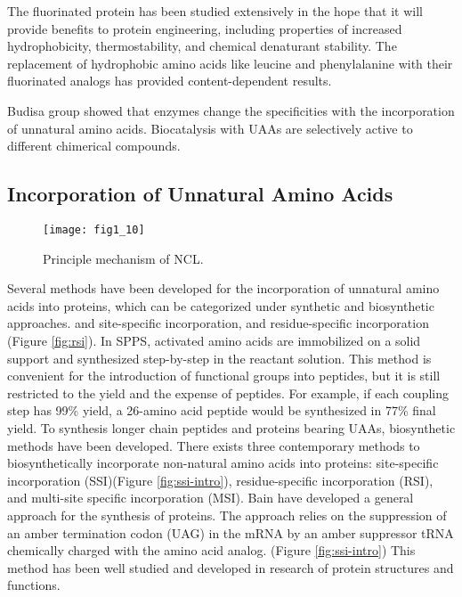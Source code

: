 \begin{refsection}
The fluorinated protein has been studied extensively in the hope that it will
provide benefits to protein engineering, including properties of increased
hydrophobicity, thermostability, and chemical denaturant
stability\cite{Voloshchuk2007b}. The replacement of hydrophobic amino acids
like leucine and phenylalanine with their fluorinated analogs has provided
content-dependent results.

Budisa group showed that enzymes change the specificities with the
incorporation of unnatural amino acids\cite{Budisa2006}. Biocatalysis with UAAs
are selectively active to different chimerical compounds. 

\subsection{Incorporation of Unnatural Amino Acids} 
\label{sec:rsi-intro}

\begin{figure}[h!] \centering \texttt{[image: fig1\_10]}
    \caption[Princilple mechanism of NCL.]{Principle mechanism of NCL.} 
    \label{fig:ncl-intro} 
\end{figure}

Several methods have been developed for the incorporation of unnatural amino
acids into proteins, which can be categorized under synthetic and biosynthetic
approaches.  and  site-specific
incorporation,\cite{Cellitti2008,Hassan2008} and residue-specific incorporation
(Figure \ref{fig:rsi})\cite{Johnson2010}.  In SPPS, activated amino acids are
immobilized on a solid support and synthesized step-by-step in the reactant
solution. This method is convenient for the introduction of functional groups
into peptides, but it is still restricted to the yield and the expense of
peptides. For example, if each coupling step has 99\% yield, a 26-amino acid
peptide would be synthesized in 77\% final yield.  To synthesis longer chain
peptides and proteins bearing UAAs, biosynthetic methods have been developed.
There exists three contemporary methods to biosynthetically incorporate
non-natural amino acids into proteins: site-specific incorporation (SSI)(Figure
\ref{fig:ssi-intro}), residue-specific incorporation (RSI), and multi-site
specific incorporation (MSI). Bain  have developed a general
approach for the  synthesis of proteins\cite{Bain1991}.  The
approach relies on the suppression of an amber termination codon (UAG) in the
mRNA by an amber suppressor tRNA chemically charged with the amino acid analog.
(Figure \ref{fig:ssi-intro}) This method has been well studied and developed in
research of protein structures and functions\cite{Martoglio1995,Eichler1997}.


\end{refsection}
